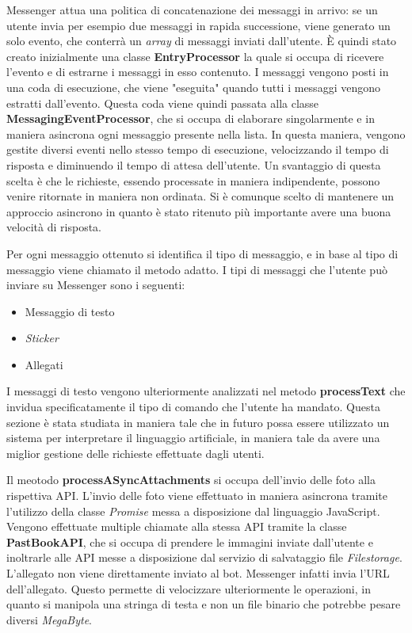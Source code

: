 Messenger attua una politica di concatenazione dei messaggi in arrivo: se un
utente invia per esempio due messaggi in rapida successione, viene generato un
solo evento, che conterrà un \textit{array} di messaggi inviati dall'utente. È
quindi stato creato inizialmente una classe \textbf{EntryProcessor} la quale si
occupa di ricevere l'evento e di estrarne i messaggi in esso contenuto. I
messaggi vengono posti in una coda di esecuzione, che viene "eseguita" quando
tutti i messaggi vengono estratti dall'evento.
Questa coda viene quindi passata alla classe \textbf{MessagingEventProcessor},
che si occupa di elaborare singolarmente e in maniera asincrona ogni messaggio
presente nella lista. In questa maniera, vengono gestite diversi eventi nello
stesso tempo di esecuzione, velocizzando il tempo di risposta e diminuendo il
tempo di attesa dell'utente. Un svantaggio di questa scelta è che le richieste,
essendo processate in maniera indipendente, possono venire ritornate in maniera
non ordinata. Si è comunque scelto di mantenere un approccio asincrono in
quanto è stato ritenuto più importante avere una buona velocità di risposta.

Per ogni messaggio ottenuto si identifica il tipo di messaggio, e in base al
tipo di messaggio viene chiamato il metodo adatto.
I tipi di messaggi che l'utente può inviare su Messenger sono i seguenti:
\begin{itemize}
  \item Messaggio di testo
  \item \textit{Sticker}
  \item Allegati
\end{itemize}
I messaggi di testo vengono ulteriormente analizzati nel metodo
\textbf{processText} che invidua specificatamente il tipo di comando che
l'utente ha mandato. Questa sezione è stata studiata in maniera tale che in
futuro possa essere utilizzato un sistema per interpretare il linguaggio
artificiale, in maniera tale da avere una miglior gestione delle richieste
effettuate dagli utenti.

Il meotodo \textbf{processASyncAttachments} si occupa dell'invio delle foto
alla rispettiva API. L'invio delle foto viene effettuato in maniera asincrona
tramite l'utilizzo della classe \textit{Promise} messa a disposizione dal
linguaggio JavaScript. Vengono effettuate multiple chiamate alla stessa API
tramite la classe \textbf{PastBookAPI}, che si occupa di prendere le immagini
inviate dall'utente e inoltrarle alle API messe a disposizione dal servizio di
salvataggio file \textit{Filestorage}.
L'allegato non viene direttamente inviato al bot. Messenger infatti invia l'URL
dell'allegato. Questo permette di velocizzare ulteriormente le operazioni, in
quanto si manipola una stringa di testa e non un file binario che potrebbe
pesare diversi \textit{MegaByte}.

